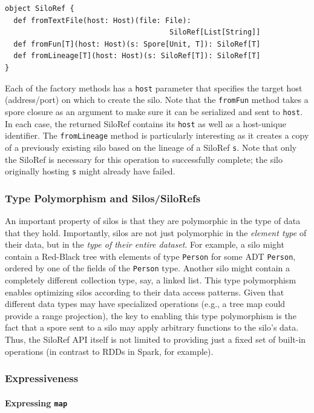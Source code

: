\documentclass[10pt]{sigplanconf}
\theoremstyle{definition}
\theoremstyle{definition}
\begin{document}
\begin{lstlisting}
object SiloRef {
  def fromTextFile(host: Host)(file: File):
                                      SiloRef[List[String]]
  def fromFun[T](host: Host)(s: Spore[Unit, T]): SiloRef[T]
  def fromLineage[T](host: Host)(s: SiloRef[T]): SiloRef[T]
}
\end{lstlisting}
\noindent
Each of the factory methods has a \verb|host| parameter that specifies the
target host (address/port) on which to create the silo. Note that the
\verb|fromFun| method takes a spore closure as an argument to make sure it can
be serialized and sent to \verb|host|. In each case, the returned SiloRef
contains its \verb|host| as well as a host-unique identifier. The
\verb|fromLineage| method is particularly interesting as it creates a copy of a
previously existing silo based on the lineage of a SiloRef \verb|s|. Note that
only the SiloRef is necessary for this operation to successfully complete; the
silo originally hosting \verb|s| might already have failed.

\subsubsection{Type Polymorphism and Silos/SiloRefs}

An important property of silos is that they are polymorphic in the type of data
that they hold. Importantly, silos are not just polymorphic in the {\em element
type} of their data, but in the {\em type of their entire dataset}. For example,
a silo might contain a Red-Black tree with elements of type \verb|Person| for
some ADT \verb|Person|, ordered by one of the fields of the \verb|Person| type.
Another silo might contain a completely different collection type, say, a linked
list. This type polymorphism enables optimizing silos according to their data
access patterns. Given that different data types may have specialized operations
(e.g., a tree map could provide a range projection), the key to enabling this
type polymorphism is the fact that a spore sent to a silo may apply arbitrary
functions to the silo's data. Thus, the SiloRef API itself is not limited to
providing just a fixed set of built-in operations (in contrast to RDDs in Spark,
for example).

\subsubsection{Expressiveness}
\label{sec:expr}

\paragraph{Expressing \texttt{map}}
\end{document}
